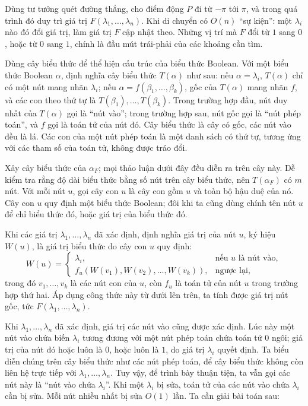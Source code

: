 \documentclass[11pt]{article}
\begin{document}
Dùng tư tưởng quét đường thẳng, cho điểm động \(P\) đi từ \(-\pi\) tới \(\pi\),
và trong quá trình đó duy trì giá trị \(F(\lambda_1,\ldots,\lambda_n)\). Khi
di chuyển có \(O(n)\) ``sự kiện'': một \(\lambda_i\) nào đó đổi giá trị, làm
giá trị \(F\) cập nhật theo. Những vị trí mà \(F\) đổi từ \(1\) sang \(0\), hoặc
từ \(0\) sang \(1\), chính là đầu mút trái-phải của các khoảng cần tìm.

Dùng cây biểu thức để thể hiện cấu trúc của biểu thức Boolean. Với một biểu
thức Boolean \(\alpha\), định nghĩa cây biểu thức \(T(\alpha)\) như sau: nếu
\(\alpha=\lambda_i\), \(T(\alpha)\) chỉ có một nút mang nhãn \(\lambda_i\); nếu
\(\alpha=f(\beta_1,\ldots,\beta_k)\), gốc của \(T(\alpha)\) mang nhãn \(f\), và
các con theo thứ tự là \(T(\beta_1),\ldots,T(\beta_k)\). Trong trường hợp đầu,
nút duy nhất của \(T(\alpha)\) gọi là ``nút vào''; trong trường hợp sau, nút
gốc gọi là ``nút phép toán'', và \(f\) gọi là toán tử của nút đó. Cây biểu thức
là cây có gốc, các nút vào đều là lá. Các con của một nút phép toán là một danh
sách có thứ tự, tương ứng với các tham số của toán tử, không được tráo đổi.

Xây cây biểu thức của \(\alpha_F\); mọi thảo luận dưới đây đều diễn ra trên cây
này. Dễ kiểm tra rằng độ dài biểu thức bằng số nút trên cây biểu thức, nên
\(T(\alpha_F)\) có \(m\) nút. Với mỗi nút \(u\), gọi cây con \(u\) là cây con
gồm \(u\) và toàn bộ hậu duệ của nó. Cây con \(u\) quy định một biểu thức
Boolean; đôi khi ta cũng dùng chính tên nút \(u\) để chỉ biểu thức đó, hoặc giá
trị của biểu thức đó.

Khi các giá trị \(\lambda_1,\ldots,\lambda_n\) đã xác định, định nghĩa giá trị
của nút \(u\), ký hiệu \(W(u)\), là giá trị biểu thức do cây con \(u\) quy định:
\[
W(u)=
\begin{cases}
\lambda_i, & \text{nếu }u\text{ là nút vào},\\
f_u(W(v_1),W(v_2),\ldots,W(v_k)), & \text{ngược lại},
\end{cases}
\]
trong đó \(v_1,\ldots,v_k\) là các nút con của \(u\), còn \(f_u\) là toán tử
của nút \(u\) trong trường hợp thứ hai. Áp dụng công thức này từ dưới lên trên,
ta tính được giá trị nút gốc, tức \(F(\lambda_1,\ldots,\lambda_n)\).

Khi \(\lambda_1,\ldots,\lambda_n\) đã xác định, giá trị các nút vào cũng được
xác định. Lúc này một nút vào chứa biến \(\lambda_i\) tương đương với một nút
phép toán chứa toán tử \(0\) ngôi; giá trị của nút đó hoặc luôn là \(0\), hoặc
luôn là \(1\), do giá trị \(\lambda_i\) quyết định. Ta biểu diễn chúng trên cây
biểu thức như các nút phép toán, để cây biểu thức không còn liên hệ trực tiếp
với \(\lambda_1,\ldots,\lambda_n\). Tuy vậy, để trình bày thuận tiện, ta vẫn
gọi các nút này là ``nút vào chứa \(\lambda_i\)''. Khi một \(\lambda_i\) bị sửa,
toán tử của các nút vào chứa \(\lambda_i\) cần bị sửa. Mỗi nút nhiều nhất bị
sửa \(O(1)\) lần. Ta cần giải bài toán sau:
\end{document}
